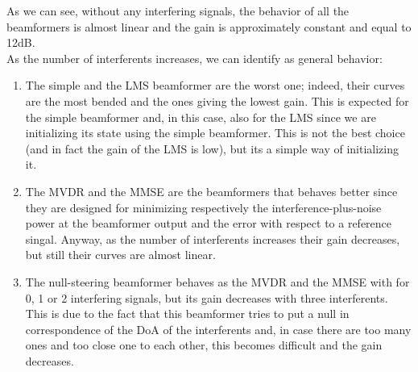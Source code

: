 As we can see, without any interfering signals, the behavior of all the beamformers is almost linear and the gain is 
approximately constant and equal to 12dB.\\ 
As the number of interferents increases, we can identify as general behavior:

\begin{enumerate}
    \item The simple and the LMS beamformer are the worst one; indeed, their curves are the most bended and the 
            ones giving the lowest gain. This is expected for the simple beamformer and, in this case, also for the LMS
            since we are initializing its state using the simple beamformer. This is not the best choice (and
            in fact the gain of the LMS is low), but its a simple way of initializing it.
    \item The MVDR and the MMSE are the beamformers that behaves better since they are designed for minimizing respectively the 
            interference-plus-noise power at the beamformer output and the error with respect to a reference singal. Anyway, as 
            the number of interferents increases their gain decreases, but still their curves are almost linear. 
    \item The null-steering beamformer behaves as the MVDR and the MMSE with for 0, 1 or 2 interfering signals, but its gain
            decreases with three interferents. This is due to the fact that this beamformer tries to put a null in correspondence
            of the DoA of the interferents and, in case there are too many ones and too close one to each other, this becomes 
            difficult and the gain decreases.
\end{enumerate}